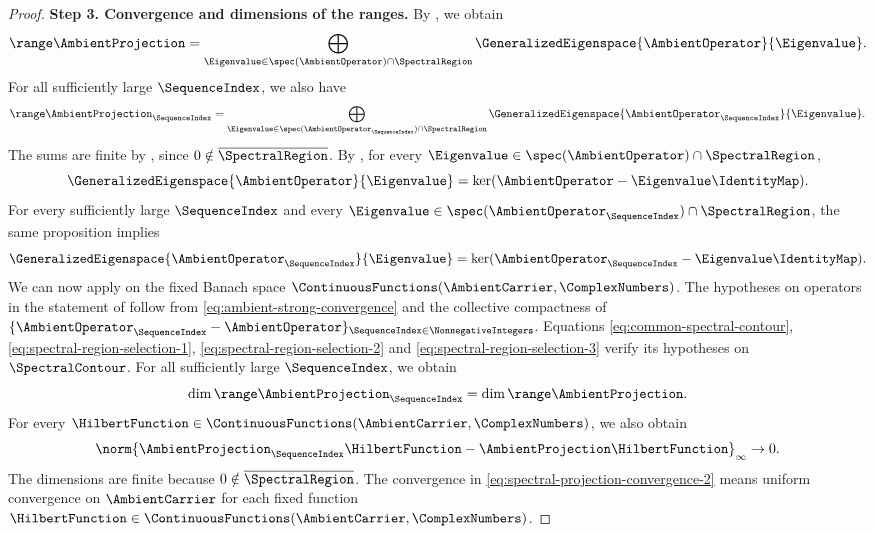 \begin{proof}
\textbf{Step 3. Convergence and dimensions of the ranges.}
By ,
we obtain
\begin{equation}\label{eq:ambient-projection-range}
 \range\AmbientProjection
 =\bigoplus_{\Eigenvalue\in\spec(\AmbientOperator)\cap\SpectralRegion}
   \GeneralizedEigenspace{\AmbientOperator}{\Eigenvalue}.
\end{equation}
For all sufficiently large
$\SequenceIndex$,
we also have
\begin{equation}\label{eq:approximating-projection-range}
 \range\AmbientProjection_\SequenceIndex
 =\bigoplus_{\Eigenvalue\in\spec(\AmbientOperator_\SequenceIndex)\cap\SpectralRegion}
   \GeneralizedEigenspace{\AmbientOperator_\SequenceIndex}{\Eigenvalue}.
\end{equation}
The sums are finite by ,
since
$0\notin\overline\SpectralRegion$.
By ,
for every
$\Eigenvalue\in\spec(\AmbientOperator)\cap\SpectralRegion$,
\begin{equation}\label{eq:projection-range-eigenspace}
 \GeneralizedEigenspace{\AmbientOperator}{\Eigenvalue}
 =\ker(\AmbientOperator-\Eigenvalue\IdentityMap).
\end{equation}
For every sufficiently large
$\SequenceIndex$
and every
$\Eigenvalue\in\spec(\AmbientOperator_\SequenceIndex)\cap\SpectralRegion$,
the same proposition implies
\begin{equation}\label{eq:approximating-range-eigenspace}
 \GeneralizedEigenspace{\AmbientOperator_\SequenceIndex}{\Eigenvalue}
 =\ker(\AmbientOperator_\SequenceIndex-\Eigenvalue\IdentityMap).
\end{equation}
We can now apply 
on the fixed Banach space
$\ContinuousFunctions(\AmbientCarrier,\ComplexNumbers)$.
The hypotheses on operators in the statement of
follow from \eqref{eq:ambient-strong-convergence}
and the collective compactness of
$\{\AmbientOperator_\SequenceIndex-\AmbientOperator\}_{\SequenceIndex\in\NonnegativeIntegers}$.
Equations \eqref{eq:common-spectral-contour},
\eqref{eq:spectral-region-selection-1},
\eqref{eq:spectral-region-selection-2} and \eqref{eq:spectral-region-selection-3}
verify its hypotheses on
$\SpectralContour$.
For all sufficiently large
$\SequenceIndex$,
we obtain
\begin{equation}\label{eq:spectral-projection-convergence-1}
 \dim\range \AmbientProjection _\SequenceIndex =\dim\range \AmbientProjection .
\end{equation}
For every
$\HilbertFunction\in\ContinuousFunctions(\AmbientCarrier,\ComplexNumbers)$,
we also obtain
\begin{equation}\label{eq:spectral-projection-convergence-2}
 \norm{\AmbientProjection _\SequenceIndex \HilbertFunction -\AmbientProjection \HilbertFunction }_\infty\to0.
\end{equation}
The dimensions are finite because
$0\notin\overline\SpectralRegion $.
The convergence in \eqref{eq:spectral-projection-convergence-2} means
uniform convergence on
$\AmbientCarrier$
for each fixed function
$\HilbertFunction\in\ContinuousFunctions(\AmbientCarrier,\ComplexNumbers)$.


\end{proof}
